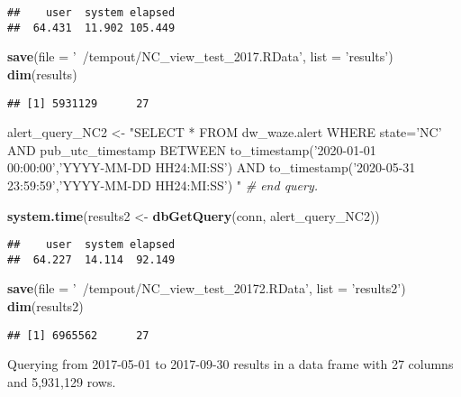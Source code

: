 \documentclass[]{article}
\newenvironment{Shaded}{\begin{snugshade}}{\end{snugshade}}
\newcommand{\CommentTok}[1]{\textcolor[rgb]{0.56,0.35,0.01}{\textit{#1}}}
\newcommand{\DataTypeTok}[1]{\textcolor[rgb]{0.13,0.29,0.53}{#1}}
\newcommand{\KeywordTok}[1]{\textcolor[rgb]{0.13,0.29,0.53}{\textbf{#1}}}
\newcommand{\NormalTok}[1]{#1}
\newcommand{\StringTok}[1]{\textcolor[rgb]{0.31,0.60,0.02}{#1}}
\begin{document}
\begin{verbatim}
##    user  system elapsed 
##  64.431  11.902 105.449
\end{verbatim}

\begin{Shaded}
\begin{Highlighting}[]
\KeywordTok{save}\NormalTok{(}\DataTypeTok{file =} \StringTok{'~/tempout/NC_view_test_2017.RData'}\NormalTok{, }\DataTypeTok{list =} \StringTok{'results'}\NormalTok{)}
\KeywordTok{dim}\NormalTok{(results)}
\end{Highlighting}
\end{Shaded}

\begin{verbatim}
## [1] 5931129      27
\end{verbatim}

\begin{Shaded}
\begin{Highlighting}[]
\NormalTok{alert_query_NC2 <-}\StringTok{ "SELECT * FROM dw_waze.alert}
\StringTok{                    WHERE state='NC'}
\StringTok{                    AND pub_utc_timestamp BETWEEN to_timestamp('2020-01-01 00:00:00','YYYY-MM-DD HH24:MI:SS') }
\StringTok{                                          AND     to_timestamp('2020-05-31 23:59:59','YYYY-MM-DD HH24:MI:SS')}
\StringTok{                      "} \CommentTok{# end query. }

\KeywordTok{system.time}\NormalTok{(results2 <-}\StringTok{ }\KeywordTok{dbGetQuery}\NormalTok{(conn, alert_query_NC2))}
\end{Highlighting}
\end{Shaded}

\begin{verbatim}
##    user  system elapsed 
##  64.227  14.114  92.149
\end{verbatim}

\begin{Shaded}
\begin{Highlighting}[]
\KeywordTok{save}\NormalTok{(}\DataTypeTok{file =} \StringTok{'~/tempout/NC_view_test_20172.RData'}\NormalTok{, }\DataTypeTok{list =} \StringTok{'results2'}\NormalTok{)}
\KeywordTok{dim}\NormalTok{(results2)}
\end{Highlighting}
\end{Shaded}

\begin{verbatim}
## [1] 6965562      27
\end{verbatim}

Querying from 2017-05-01 to 2017-09-30 results in a data frame with 27
columns and 5,931,129 rows.
\end{document}
